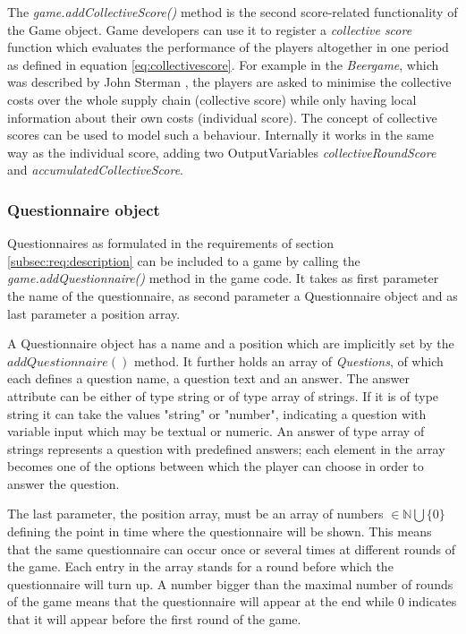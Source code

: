 The \textit{game.addCollectiveScore()} method is the second score-related functionality of the Game object. Game developers can use it to register a \textit{collective score} function which evaluates the performance of the players altogether in one period as defined in equation \ref{eq:collectivescore}. For example in the \textit{Beergame}, which was described by John Sterman \cite{beergame}, the players are asked to minimise the collective costs over the whole supply chain (collective score) while only having local information about their own costs (individual score). The concept of collective scores can be used to model such a behaviour. Internally it works in the same way as the individual score, adding two OutputVariables \textit{collectiveRoundScore} and \textit{accumulatedCollectiveScore}.

\subsubsection{Questionnaire object}
\label{subsub:quest}

Questionnaires as formulated in the requirements of section \ref{subsec:req:description} can be included to a game by calling the \textit{game.addQuestionnaire()} method in the game code. It takes as first parameter the name of the questionnaire, as second parameter a Questionnaire object and as last parameter a position array.

A Questionnaire object has a name and a position which are implicitly set by the \newline
$addQuestionnaire()$ method. It further holds an array of \textit{Questions}, of which each defines a question name, a question text and an answer. The answer attribute can be either of type string or of type array of strings. If it is of type string it can take the values "string" or "number", indicating a question with variable input which may be textual or numeric. An answer of type array of strings represents a question with predefined answers; each element in the array becomes one of the options between which the player can choose in order to answer the question.

The last parameter, the position array, must be an array of numbers $\in \mathbb{N} \bigcup \{0\}$ defining the point in time where the questionnaire will be shown. This means that the same questionnaire can occur once or several times at different rounds of the game. Each entry in the array stands for a round before which the questionnaire will turn up. A number bigger than the maximal number of rounds of the game means that the questionnaire will appear at the end while 0 indicates that it will appear before the first round of the game.

